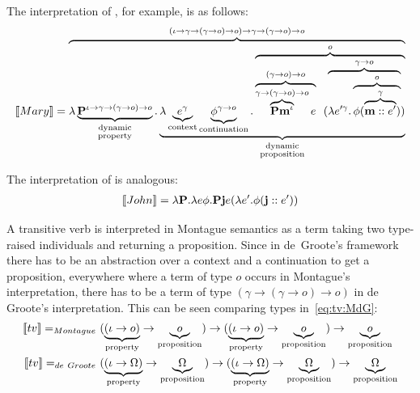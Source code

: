 The interpretation of , for example, is as follows: 
\begin{align}
\I{Mary} =  \overbrace{\lambda \underbrace{{\P2}^{\iota \rightarrow \gamma \rightarrow (\gamma \rightarrow o) \rightarrow o}}_{\begin{smallmatrix}
\text{dynamic}\\
\text{property}
\end{smallmatrix}}. \underbrace{\lambda \underbrace{{e}^{\gamma}}_{\text{context}} \underbrace{{\phi}^{\gamma \rightarrow o}}_{\text{continuation}}. \overbrace{\overbrace{\overbrace{\P2 {\textbf{m}}^{\iota}}^{\gamma \rightarrow (\gamma \rightarrow o) \rightarrow o} e}^{(\gamma \rightarrow o) \rightarrow o} \ \ (\overbrace{\lambda e'^{\gamma}. \overbrace{\phi ( \overbrace{\upii{\textbf{m}}{e'}}^{\gamma})}^{o}}^{\gamma \rightarrow o})}^{o}}_{
\begin{smallmatrix}
\text{dynamic}\\
\text{proposition}
\end{smallmatrix}}}^{(\iota \rightarrow \gamma \rightarrow (\gamma \rightarrow o) \rightarrow o) \rightarrow \gamma \rightarrow (\gamma \rightarrow o) \rightarrow o}\label{eq:dG:Mary}
\end{align}

The interpretation of  is analogous:
\begin{align}
\I{John} = \lambda \P2. \lambda e \phi. \P2 \textbf{j} e (\lambda e' .\phi (\textbf{j}::{e'})) \label{eq:dG:John}
\end{align}

A transitive verb is interpreted in Montague semantics as a term taking two type-raised individuals and returning a proposition.  Since in de~Groote's framework there has to be an abstraction over a context and a continuation to get a proposition,  everywhere where a term of type $o$ occurs in Montague's interpretation, there has to be a term of type $(\gamma \rightarrow (\gamma \rightarrow o) \rightarrow o)$ in de Groote's interpretation. This can be seen comparing types in~\eqref{eq:tv:MdG}:
\begin{subequations}
\begin{align}
\I{tv} =_{Montague} \ & (\underbrace{(\iota \rightarrow   o)}_{\text{property}} \rightarrow \underbrace{o}_{\text{proposition}}) \rightarrow (\underbrace{(\iota \rightarrow   o)}_{\text{property}} \rightarrow \underbrace{o}_{\text{proposition}})  \rightarrow \underbrace{o}_{\text{proposition}} \\
\I{tv} =_{de~Groote} \ &  (\underbrace{(\iota \rightarrow   \Omega)}_{\text{property}} \rightarrow \underbrace{\Omega}_{\text{proposition}}) \rightarrow (\underbrace{(\iota \rightarrow   \Omega)}_{\text{property}} \rightarrow \underbrace{\Omega}_{\text{proposition}})  \rightarrow \underbrace{\Omega}_{\text{proposition}} 
\end{align} \label{eq:tv:MdG}
\end{subequations}

